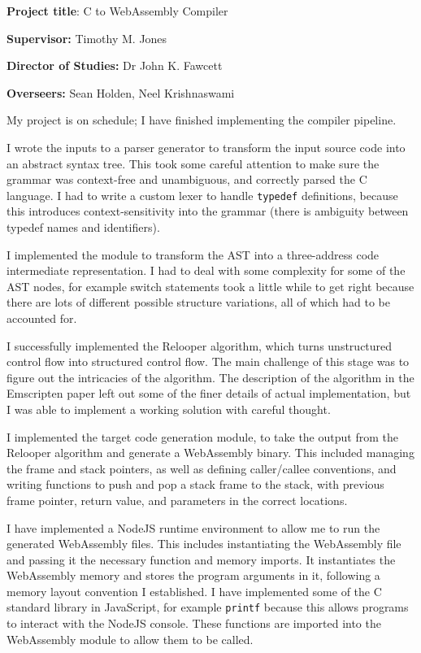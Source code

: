 \documentclass[12pt, a4paper]{article}
\begin{document}
\textbf{Project title}: C to WebAssembly Compiler

\textbf{Supervisor:} Timothy M. Jones

\textbf{Director of Studies:} Dr John K. Fawcett

\textbf{Overseers:} Sean Holden, Neel Krishnaswami

\vspace{3\parskip}

My project is on schedule; I have finished implementing the compiler pipeline.

I wrote the inputs to a parser generator to transform the input source code into an abstract syntax tree.
This took some careful attention to make sure the grammar was context-free and unambiguous, and correctly parsed the C language.
I had to write a custom lexer to handle \texttt{typedef} definitions, because this introduces context-sensitivity into the grammar (there is ambiguity between typedef names and identifiers).

I implemented the module to transform the AST into a three-address code intermediate representation.
I had to deal with some complexity for some of the AST nodes, for example switch statements took a little while to get right because there are lots of different possible structure variations, all of which had to be accounted for.

I successfully implemented the Relooper algorithm, which turns unstructured control flow into structured control flow.
The main challenge of this stage was to figure out the intricacies of the algorithm. The description of the algorithm in the Emscripten paper left out some of the finer details of actual implementation, but I was able to implement a working solution with careful thought.

I implemented the target code generation module, to take the output from the Relooper algorithm and generate a WebAssembly binary.
This included managing the frame and stack pointers, as well as defining caller/callee conventions, and writing functions to push and pop a stack frame to the stack, with previous frame pointer, return value, and parameters in the correct locations.

I have implemented a NodeJS runtime environment to allow me to run the generated WebAssembly files.
This includes instantiating the WebAssembly file and passing it the necessary function and memory imports.
It instantiates the WebAssembly memory and stores the program arguments in it, following a memory layout convention I established.
I have implemented some of the C standard library in JavaScript, for example \texttt{printf} because this allows programs to interact with the NodeJS console. These functions are imported into the WebAssembly module to allow them to be called.
\end{document}
